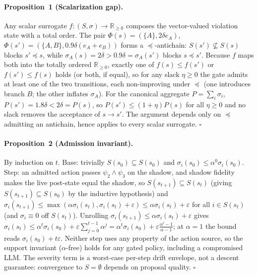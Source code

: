\documentclass[letterpaper]{article} %
\newcommand{\psitwo}{\psi_2}
\newcommand{\psithree}{\psi_3}
\begin{document}
\paragraph{Proposition~1 (Scalarization gap).}
Any scalar surrogate $f:(S,\sigma)\to\mathbb{R}_{\ge0}$ composes the vector-valued violation state with a total order. The pair $\Phi(s)=(\{A\},2\delta e_A)$, $\Phi(s')=(\{A,B\},0.9\delta(e_A{+}e_B))$ forms a $\preceq$-antichain: $S(s')\not\subseteq S(s)$ blocks $s'\preceq s$, while $\sigma_A(s)=2\delta>0.9\delta=\sigma_A(s')$ blocks $s\preceq s'$. Because $f$ maps both into the totally ordered $\mathbb{R}_{\ge0}$, exactly one of $f(s)\le f(s')$ or $f(s')\le f(s)$ holds (or both, if equal), so for any slack $\eta\ge0$ the gate admits at least one of the two transitions, each non-improving under $\preceq$ (one introduces branch $B$; the other inflates $\sigma_A$). For the canonical aggregate $P=\sum_i\sigma_i$, $P(s')=1.8\delta<2\delta=P(s)$, so $P(s')\le(1{+}\eta)P(s)$ for all $\eta\ge0$ and no slack removes the acceptance of $s\to s'$. The argument depends only on $\preceq$ admitting an antichain, hence applies to every scalar surrogate. $\square$

\paragraph{Proposition~2 (Admission invariant).}
By induction on $t$. Base: trivially $S(s_0)\subseteq S(s_0)$ and $\sigma_i(s_0)\le\alpha^0\sigma_i(s_0)$. Step: an admitted action passes $\psitwo\wedge\psithree$ on the shadow, and shadow fidelity makes the live post-state equal the shadow, so $S(s_{t+1})\subseteq S(s_t)$ (giving $S(s_{t+1})\subseteq S(s_0)$ by the inductive hypothesis) and $\sigma_i(s_{t+1})\le\max(\alpha\sigma_i(s_t),\sigma_i(s_t)+\varepsilon)\le\alpha\sigma_i(s_t)+\varepsilon$ for all $i\in S(s_t)$ (and $\sigma_i\equiv0$ off $S(s_t)$). Unrolling $\sigma_i(s_{t+1})\le\alpha\sigma_i(s_t)+\varepsilon$ gives $\sigma_i(s_t)\le\alpha^{t}\sigma_i(s_0)+\varepsilon\sum_{j=0}^{t-1}\alpha^{j}=\alpha^{t}\sigma_i(s_0)+\varepsilon\tfrac{\alpha^{t}-1}{\alpha-1}$; at $\alpha{=}1$ the bound reads $\sigma_i(s_0)+t\varepsilon$. Neither step uses any property of the action source, so the support invariant ($\alpha$-free) holds for any gated policy, including a compromised LLM. The severity term is a worst-case per-step drift envelope, not a descent guarantee: convergence to $S=\emptyset$ depends on proposal quality. $\square$
\end{document}
